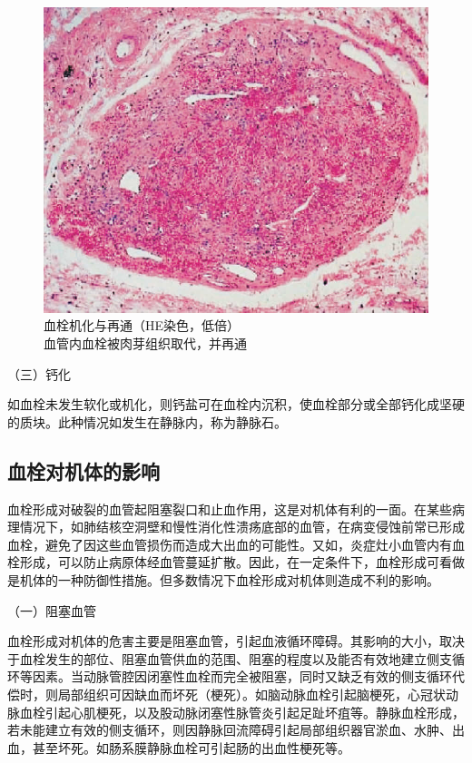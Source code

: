 \begin{figure}[!htbp]
\centering
\includegraphics{./images/Image00042.jpg}
\caption{血栓机化与再通（HE染色，低倍） \\ {\small 血管内血栓被肉芽组织取代，并再通}}
\label{fig3-8} 
\end{figure} 


{（三）钙化}

如血栓未发生软化或机化，则钙盐可在血栓内沉积，使血栓部分或全部钙化成坚硬的质块。此种情况如发生在静脉内，称为静脉石。

\subsection{血栓对机体的影响}

血栓形成对破裂的血管起阻塞裂口和止血作用，这是对机体有利的一面。在某些病理情况下，如肺结核空洞壁和慢性消化性溃疡底部的血管，在病变侵蚀前常已形成血栓，避免了因这些血管损伤而造成大出血的可能性。又如，炎症灶小血管内有血栓形成，可以防止病原体经血管蔓延扩散。因此，在一定条件下，血栓形成可看做是机体的一种防御性措施。但多数情况下血栓形成对机体则造成不利的影响。

{（一）阻塞血管}

血栓形成对机体的危害主要是阻塞血管，引起血液循环障碍。其影响的大小，取决于血栓发生的部位、阻塞血管供血的范围、阻塞的程度以及能否有效地建立侧支循环等因素。当动脉管腔因闭塞性血栓而完全被阻塞，同时又缺乏有效的侧支循环代偿时，则局部组织可因缺血而坏死（梗死）。如脑动脉血栓引起脑梗死，心冠状动脉血栓引起心肌梗死，以及股动脉闭塞性脉管炎引起足趾坏疽等。静脉血栓形成，若未能建立有效的侧支循环，则因静脉回流障碍引起局部组织器官淤血、水肿、出血，甚至坏死。如肠系膜静脉血栓可引起肠的出血性梗死等。

